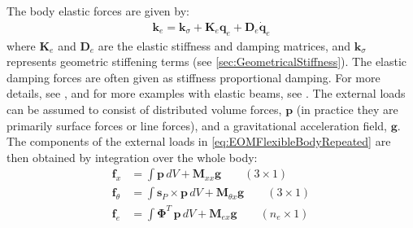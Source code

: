 \documentclass[wes, manuscript]{copernicus}
\renewcommand{\v}[1]{\boldsymbol{#1}}
\newcommand{\m}[1]{\boldsymbol{#1}}
\begin{document}
% 
The body elastic forces are given by:
\begin{align}
  \v{k}_e =  \v{k}_\sigma + \m{K}_e \v{q}_e  + \m{D}_e \v{\dot{q}}_e     %
\end{align}
where $\m{K}_e$ and $\m{D}_e$ are the elastic stiffness and damping matrices, and $\v{k}_\sigma$ represents geometric stiffening terms (see \autoref{sec:GeometricalStiffness}). 
The elastic damping forces are often given as stiffness proportional damping.
For more details, see \cite{Wallrapp:1994}, and for more examples with elastic beams, see \cite{branlard:2019flex}.
% 
The external loads can be assumed to consist of distributed volume forces, $\v{p}$ (in practice they are primarily surface forces or line forces), and a gravitational acceleration field, $\v{g}$.
The components of the external loads  in  \autoref{eq:EOMFlexibleBodyRepeated} are then obtained by integration over the whole body:
\begin{align}
    \v{f}_x&=\int \v{p} \, dV
        + \m{M}_{xx}\v{g}
        \qquad (3\times 1)
            \label{eq:genQgeneral}
    \\
    \v{f}_\theta&=\int \v{s}_P\times\v{p} \, dV
        + \m{M}_{\theta x}\v{g}
        \qquad (3\times 1)
    \\
    \v{f}_e&=\int {\m{\Phi}}^T\, \v{p} \, dV
        + \m{M}_{e x}\v{g}
        \qquad (n_e\times 1)
\end{align}



\end{document}
